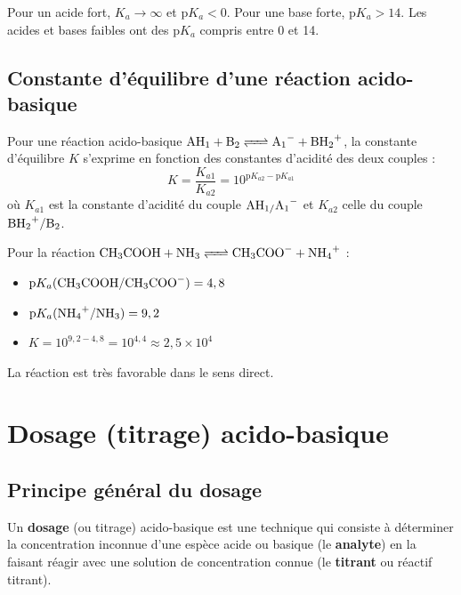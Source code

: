\begin{aretenir}
Pour un acide fort, $K_a \to \infty$ et $\mathrm{p}K_a < 0$. Pour une base forte, $\mathrm{p}K_a > 14$. Les acides et bases faibles ont des $\mathrm{p}K_a$ compris entre 0 et 14.
\end{aretenir}

\subsection{Constante d'équilibre d'une réaction acido-basique}

\begin{loi}
Pour une réaction acido-basique $\ce{AH1 + B2 <=> A1- + BH2+}$, la constante d'équilibre $K$ s'exprime en fonction des constantes d'acidité des deux couples :
\[K = \frac{K_{a1}}{K_{a2}} = 10^{\mathrm{p}K_{a2} - \mathrm{p}K_{a1}}\]
où $K_{a1}$ est la constante d'acidité du couple $\ce{AH1/A1-}$ et $K_{a2}$ celle du couple $\ce{BH2+/B2}$.
\end{loi}

\begin{exemple}
Pour la réaction $\ce{CH3COOH + NH3 <=> CH3COO- + NH4+}$ :
\begin{itemize}
    \item $\mathrm{p}K_a(\ce{CH3COOH/CH3COO-}) = 4,8$
    \item $\mathrm{p}K_a(\ce{NH4+/NH3}) = 9,2$
    \item $K = 10^{9,2 - 4,8} = 10^{4,4} \approx 2,5 \times 10^4$
\end{itemize}
La réaction est très favorable dans le sens direct.
\end{exemple}

\section{Dosage (titrage) acido-basique}

\subsection{Principe général du dosage}

\begin{definition}
Un \textbf{dosage} (ou titrage) acido-basique est une technique qui consiste à déterminer la concentration inconnue d'une espèce acide ou basique (le \textbf{analyte}) en la faisant réagir avec une solution de concentration connue (le \textbf{titrant} ou réactif titrant).
\end{definition}

